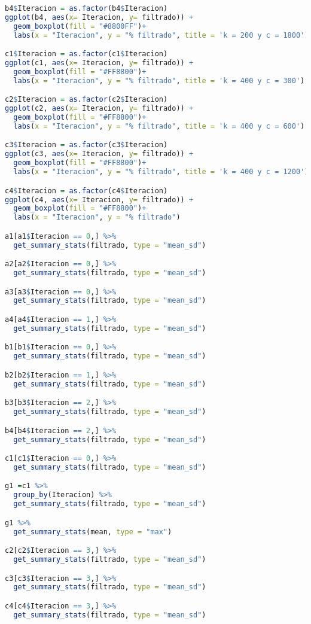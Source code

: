 \documentclass{article}
\begin{document}
\begin{lstlisting}[language=R, caption= Código para graficar el porcentaje de filtrado en cada iteración.]
b4$Iteracion = as.factor(b4$Iteracion)
ggplot(b4, aes(x= Iteracion, y= filtrado)) + 
  geom_boxplot(fill = "#8800FF")+
  labs(x = "Iteracion", y = "% filtrado", title = 'k = 200 y c = 1800')

c1$Iteracion = as.factor(c1$Iteracion)
ggplot(c1, aes(x= Iteracion, y= filtrado)) + 
  geom_boxplot(fill = "#FF8800")+
  labs(x = "Iteracion", y = "% filtrado", title = 'k = 400 y c = 300')

c2$Iteracion = as.factor(c2$Iteracion)
ggplot(c2, aes(x= Iteracion, y= filtrado)) + 
  geom_boxplot(fill = "#FF8800")+
  labs(x = "Iteracion", y = "% filtrado", title = 'k = 400 y c = 600')

c3$Iteracion = as.factor(c3$Iteracion)
ggplot(c3, aes(x= Iteracion, y= filtrado)) + 
  geom_boxplot(fill = "#FF8800")+
  labs(x = "Iteracion", y = "% filtrado", title = 'k = 400 y c = 1200')

c4$Iteracion = as.factor(c4$Iteracion)
ggplot(c4, aes(x= Iteracion, y= filtrado)) + 
  geom_boxplot(fill = "#FF8800")+
  labs(x = "Iteracion", y = "% filtrado")

a1[a1$Iteracion == 0,] %>%
  get_summary_stats(filtrado, type = "mean_sd")

a2[a2$Iteracion == 0,] %>%
  get_summary_stats(filtrado, type = "mean_sd")

a3[a3$Iteracion == 0,] %>%
  get_summary_stats(filtrado, type = "mean_sd")

a4[a4$Iteracion == 1,] %>%
  get_summary_stats(filtrado, type = "mean_sd")

b1[b1$Iteracion == 0,] %>%
  get_summary_stats(filtrado, type = "mean_sd")

b2[b2$Iteracion == 1,] %>%
  get_summary_stats(filtrado, type = "mean_sd")

b3[b3$Iteracion == 2,] %>%
  get_summary_stats(filtrado, type = "mean_sd")

b4[b4$Iteracion == 2,] %>%
  get_summary_stats(filtrado, type = "mean_sd")

c1[c1$Iteracion == 0,] %>%
  get_summary_stats(filtrado, type = "mean_sd")

g1 =c1 %>%
  group_by(Iteracion) %>%
  get_summary_stats(filtrado, type = "mean_sd")

g1 %>%
  get_summary_stats(mean, type = "max")

c2[c2$Iteracion == 3,] %>%
  get_summary_stats(filtrado, type = "mean_sd")

c3[c3$Iteracion == 3,] %>%
  get_summary_stats(filtrado, type = "mean_sd")

c4[c4$Iteracion == 3,] %>%
  get_summary_stats(filtrado, type = "mean_sd")
\end{lstlisting}
\end{document}
